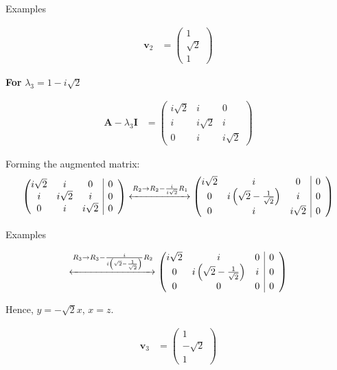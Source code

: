 \documentclass{beamer}
\makeatletter
\numberwithin{equation}{section}
\providecommand{\brak}[1]{\ensuremath{\left(#1\right)}}
\theoremstyle{remark}
\newcommand{\myvec}[1]{\ensuremath{\begin{pmatrix}#1\end{pmatrix}}}
\newenvironment{amatrix}[1]{%
  \left(\begin{array}{@{}*{#1}{c}|*{#1}{c}@{}}
}{%
  \end{array}\right)
}
\newcommand{\myaugvec}[2]{\ensuremath{\begin{amatrix}{#1}#2\end{amatrix}}}
\let\vec\mathbf
\makeatother
\begin{document}
\begin{frame}{Examples}

\begin{align}
\vec{v}_2 &= \myvec{1\\[2pt]\sqrt{2}\\[2pt]1}
\end{align}

\textbf{For} \(\lambda_3 = 1 - i\sqrt{2}\)

\begin{align}
\vec{A} - \lambda_3 \vec{I} 
&=  \myvec{
 i\sqrt{2} & i & 0\\
 i & i\sqrt{2} & i\\
 0 & i & i\sqrt{2}
}
\end{align}

Forming the augmented matrix:
\begin{align}
\myaugvec{3}{
 i\sqrt{2} & i & 0 & 0\\
 i & i\sqrt{2} & i & 0\\
 0 & i & i\sqrt{2} & 0
}
\xleftrightarrow{R_2 \to R_2 - \frac{i}{i\sqrt{2}}R_1}
\myaugvec{3}{
 i\sqrt{2} & i & 0 & 0\\
 0 & i\brak{\sqrt{2} - \frac{1}{\sqrt{2}}} & i & 0\\
 0 & i & i\sqrt{2} & 0
}
\end{align}

\end{frame}

\begin{frame}{Examples}

\begin{align}
\xleftrightarrow{R_3 \to R_3 - \frac{i}{i\brak{\sqrt{2} - \frac{1}{\sqrt{2}}}} R_2}
\myaugvec{3}{
 i\sqrt{2} & i & 0 & 0\\
 0 & i\brak{\sqrt{2} - \frac{1}{\sqrt{2}}} & i & 0\\
 0 & 0 & 0 & 0
}
\end{align}

Hence, \(y = -\sqrt{2}x\), \(x = z\).

\begin{align}
\vec{v}_3 &= \myvec{1\\[2pt]-\sqrt{2}\\[2pt]1}
\end{align}

\end{frame}
\end{document}
